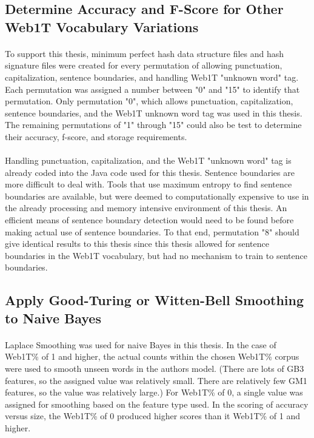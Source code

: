 \begin{singlespace}
\subsection{Determine Accuracy and F-Score for Other Web1T Vocabulary Variations}
\end{singlespace}
	\paragraph*{} To support this thesis, minimum perfect hash data structure files and hash signature files were created for every permutation of allowing punctuation, capitalization, sentence boundaries, and handling Web1T "unknown word" tag.  Each permutation was assigned a number between "0" and "15" to identify that permutation.  Only permutation "0", which allows punctuation, capitalization, sentence boundaries, and the Web1T unknown word tag was used in this thesis.  The remaining permutations of "1" through "15" could also be test to determine their accuracy, f-score, and storage requirements.
	\paragraph*{} Handling punctuation, capitalization, and the Web1T "unknown word" tag is already coded into the Java code used for this thesis.  Sentence boundaries are more difficult to deal with.  Tools that use maximum entropy to find sentence boundaries are available, but were deemed to computationally expensive to use in the already processing and memory intensive environment of this thesis.  An efficient means of sentence boundary detection would need to be found before making actual use of sentence boundaries.  To that end, permutation "8" should give identical results to this thesis since this thesis allowed for sentence boundaries in the Web1T vocabulary, but had no mechanism to train to sentence boundaries.

\subsection{Apply Good-Turing or Witten-Bell Smoothing to Naive Bayes}
	\paragraph*{} Laplace Smoothing was used for naive Bayes in this thesis. In the case of Web1T\% of 1 and higher, the actual counts within the chosen Web1T\% corpus were used to smooth unseen words in the authors model. (There are lots of GB3 features, so the assigned value was relatively small.  There are relatively few GM1 features, so the value was relatively large.)  For Web1T\% of 0, a single value was assigned for smoothing based on the feature type used. In the scoring of accuracy versus size, the Web1T\% of 0 produced higher scores than it Web1T\% of 1 and higher.  

